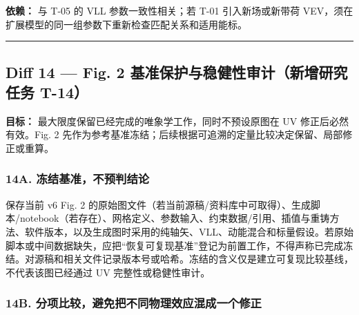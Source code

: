 \documentclass[
]{article}
\begin{document}
\textbf{依赖：} 与 T-05 的 VLL 参数一致性相关；若 T-01 引入新场或新带荷
VEV，须在扩展模型的同一组参数下重新检查匹配关系和适用能标。

\begin{center}\rule{0.5\linewidth}{0.5pt}\end{center}

\subsection{Diff 14 --- Fig. 2 基准保护与稳健性审计（新增研究任务
T-14）}\label{diff-14-fig.-2-ux57faux51c6ux4fddux62a4ux4e0eux7a33ux5065ux6027ux5ba1ux8ba1ux65b0ux589eux7814ux7a76ux4efbux52a1-t-14}

\textbf{目标：} 最大限度保留已经完成的唯象学工作，同时不预设原图在 UV
修正后必然有效。Fig. 2
先作为参考基准冻结；后续根据可追溯的定量比较决定保留、局部修正或重算。

\subsubsection{14A.
冻结基准，不预判结论}\label{a.-ux51bbux7ed3ux57faux51c6ux4e0dux9884ux5224ux7ed3ux8bba}

保存当前 v6 Fig. 2
的原始图文件（若当前源稿/资料库中可取得）、生成脚本/notebook（若存在）、网格定义、参数输入、约束数据/引用、插值与重铸方法、软件版本，以及生成图时采用的纯轴矢、VLL、动能混合和标量假设。若原始脚本或中间数据缺失，应把``恢复可复现基准''登记为前置工作，不得声称已完成冻结。对源稿和相关文件记录版本号或哈希。冻结的含义仅是建立可复现比较基线，不代表该图已经通过
UV 完整性或稳健性审计。

\subsubsection{14B.
分项比较，避免把不同物理效应混成一个修正}\label{b.-ux5206ux9879ux6bd4ux8f83ux907fux514dux628aux4e0dux540cux7269ux7406ux6548ux5e94ux6df7ux6210ux4e00ux4e2aux4feeux6b63}
\end{document}
